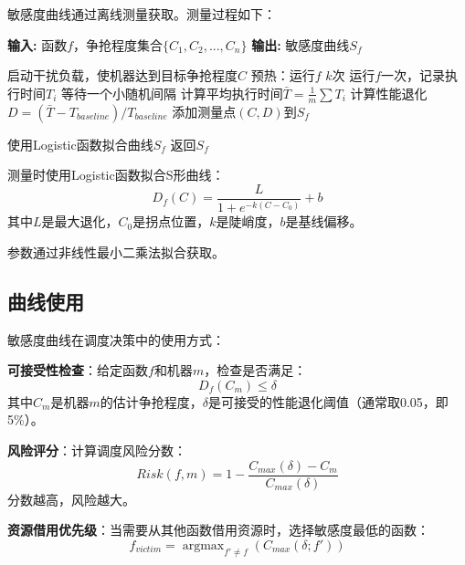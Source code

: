 \documentclass[11pt, a4paper, oneside]{article}
\DeclareMathOperator*{\argmax}{argmax}
\begin{document}
敏感度曲线通过离线测量获取。测量过程如下：

\begin{algorithm}[H]
\caption{敏感度曲线测量}
\begin{algorithmic}
\STATE \textbf{输入:} 函数$f$，争抢程度集合$\{C_1, C_2, ..., C_n\}$
\STATE \textbf{输出:} 敏感度曲线$S_f$

    \STATE 启动干扰负载，使机器达到目标争抢程度$C$
    \STATE 预热：运行$f$ $k$次
      
        \STATE 运行$f$一次，记录执行时间$T_i$
        \STATE 等待一个小随机间隔
    \ENDFOR
    \STATE 计算平均执行时间$\bar{T} = \frac{1}{m}\sum T_i$
    \STATE 计算性能退化$D = (\bar{T} - T_{baseline}) / T_{baseline}$
    \STATE 添加测量点$(C, D)$到$S_f$
\ENDFOR

\STATE 使用Logistic函数拟合曲线$S_f$
\STATE 返回$S_f$
\end{algorithmic}
\end{algorithm}

测量时使用Logistic函数拟合S形曲线：
\begin{equation}
D_f(C) = \frac{L}{1 + e^{-k(C - C_0)}} + b
\end{equation}
其中$L$是最大退化，$C_0$是拐点位置，$k$是陡峭度，$b$是基线偏移。

参数通过非线性最小二乘法拟合获取。

\subsection{曲线使用}

敏感度曲线在调度决策中的使用方式：

\textbf{可接受性检查}：给定函数$f$和机器$m$，检查是否满足：
\begin{equation}
D_f(C_m) \leq \delta
\end{equation}
其中$C_m$是机器$m$的估计争抢程度，$\delta$是可接受的性能退化阈值（通常取0.05，即5\%）。

\textbf{风险评分}：计算调度风险分数：
\begin{equation}
Risk(f, m) = 1 - \frac{C_{max}(\delta) - C_m}{C_{max}(\delta)}
\end{equation}
分数越高，风险越大。

\textbf{资源借用优先级}：当需要从其他函数借用资源时，选择敏感度最低的函数：
\begin{equation}
f_{victim} = \argmax_{f' \neq f} (C_{max}(\delta; f'))
\end{equation}
\end{document}
